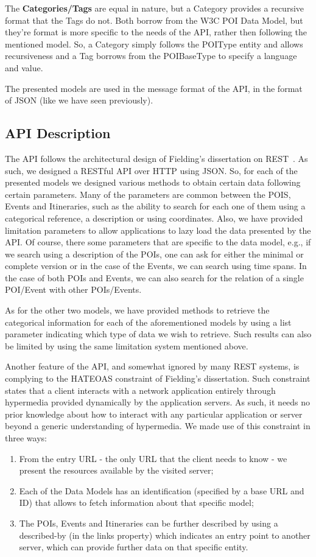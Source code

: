 \documentclass[times]{ettauth}
\begin{document}
The \textbf{Categories/Tags} are equal in nature, but a Category provides a recursive format that the Tags do not. Both borrow from the W3C POI Data Model, but they're format is more specific to the needs of the API, rather then following the mentioned model. So, a Category simply follows the POIType entity and allows recursiveness and a Tag borrows from the POIBaseType to specify a language and value.

The presented models are used in the message format of the API, in the format of \ac{JSON} (like we have seen previously).

\subsection{API Description}
The API follows the architectural design of Fielding's dissertation on \ac{REST}~\cite{fielding}. As such, we designed a RESTful API over HTTP using JSON. So, for each of the presented models we designed various methods to obtain certain data following certain parameters. Many of the parameters are common between the POIS, Events and Itineraries, such as the ability to search for each one of them using a categorical reference, a description or using coordinates. Also, we have provided limitation parameters to allow applications to lazy load the data presented by the API. Of course, there some parameters that are specific to the data model, e.g., if we search using a description of the POIs, one can ask for either the minimal or complete version or in the case of the Events, we can search using time spans. In the case of both POIs and Events, we can also search for the relation of a single POI/Event with other POIs/Events. 

As for the other two models, we have provided methods to retrieve the categorical information for each of the aforementioned models by using a list parameter indicating which type of data we wish to retrieve. Such results can also be limited by using the same limitation system mentioned above.

Another feature of the API, and somewhat ignored by many REST systems, is complying to the \acf{HATEOAS} constraint of Fielding's dissertation. Such constraint states that a client interacts with a network application entirely through hypermedia provided dynamically by the application servers. As such, it needs no prior knowledge about how to interact with any particular application or server beyond a generic understanding of hypermedia. We made use of this constraint in three ways:
\begin{enumerate}
\item From the entry URL - the only URL that the client needs to know - we present the resources available by the visited server;
\item Each of the Data Models has an identification (specified by a base URL and ID) that allows to fetch information about that specific model;
\item The POIs, Events and Itineraries can be further described by using a described-by (in the links property) which indicates an entry point to another server, which can provide further data on that specific entity.
\end{enumerate}
\end{document}
